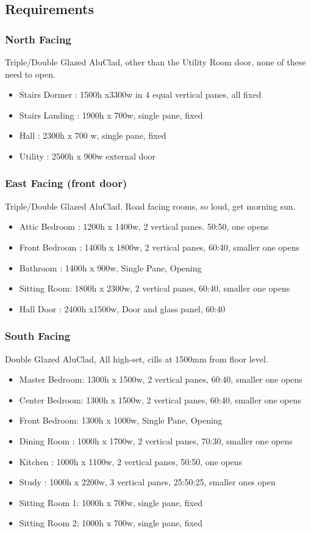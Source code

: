 \subsection{Requirements}
\subsubsection{North Facing}
Triple/Double Glazed AluClad, other than the Utility Room door, none of these need to open.
\begin{itemize}
\item Stairs Dormer : 1500h x3300w in 4 equal vertical panes, all fixed
\item Stairs Landing : 1900h x 700w, single pane, fixed
\item Hall : 2300h x 700 w, single pane, fixed
\item Utility : 2500h x 900w external door
\end{itemize}    
    
\subsubsection{East Facing (front door)}
Triple/Double Glazed AluClad. Road facing rooms, so loud, get morning sun.
\begin{itemize}
\item Attic Bedroom : 1200h x 1400w, 2 vertical panes. 50:50, one opens
\item Front Bedroom : 1400h x 1800w, 2 vertical panes, 60:40, smaller one opens
\item Bathroom : 1400h x 900w, Single Pane, Opening
\item Sitting Room: 1800h x 2300w, 2 vertical panes, 60:40, smaller one opens
\item Hall Door : 2400h x1500w, Door and glass panel, 60:40
    
\end{itemize}

\subsubsection{South Facing}
Double Glazed AluClad, All high-set, cills at 1500mm from floor level.
\begin{itemize}
\item Master Bedroom: 1300h x 1500w, 2 vertical panes, 60:40, smaller one opens
\item Center Bedroom: 1300h x 1500w, 2 vertical panes, 60:40, smaller one opens
\item Front Bedroom: 1300h x 1000w, Single Pane, Opening
\item Dining Room : 1000h x 1700w, 2 vertical panes, 70:30, smaller one opens
\item Kitchen : 1000h x 1100w, 2 vertical panes, 50:50, one opens
\item Study :   1000h x 2200w, 3 vertical panes, 25:50:25, smaller ones open
\item Sitting Room 1: 1000h x 700w, single pane, fixed
\item Sitting Room 2: 1000h x 700w, single pane, fixed
\end{itemize}

